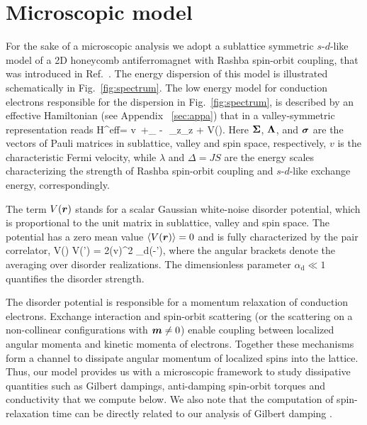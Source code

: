 \section{Microscopic model}

For the sake of a microscopic analysis we adopt a sublattice symmetric $s$-$d$-like model of a 2D honeycomb antiferromagnet with Rashba spin-orbit coupling, that was introduced in Ref.~\cite{Sumit2019}. The energy dispersion of this model is illustrated schematically in Fig.~\ref{fig:spectrum}.  
The low energy model for conduction electrons responsible for the dispersion in Fig.~\ref{fig:spectrum}, is described by an effective Hamiltonian (see Appendix ~\ref{sec:appa}) that in a valley-symmetric representation reads
\be
\label{eff}
H^\textrm{eff}= v\, \cdot\bb{\Sigma}+\lambda\lt[\bb{\sigma}\times\bb{\Sigma}\rt]_{} - \Delta\,\cdot\bb{\sigma}\,\Sigma_z\Lambda_z + V().
\e
Here $\boldsymbol{\Sigma}$, $\boldsymbol{\Lambda}$, and $\boldsymbol{\sigma}$ are the vectors of Pauli matrices in sublattice, valley and spin space, respectively, $v$ is the characteristic Fermi velocity, while $\lambda$ and $\Delta=JS$ are the energy scales characterizing the strength of Rashba spin-orbit coupling and $s$-$d$-like exchange energy, correspondingly. 

The term $V(\boldsymbol{r})$ stands for a scalar Gaussian white-noise disorder potential, which is proportional to the unit matrix in sublattice, valley and spin space. The potential has a zero mean value $\langle V(\boldsymbol{r}) \rangle=0$ and is fully characterized by the pair correlator,
\be
\lt\la V() V(') \rt\ra = 2\pi (\hbar v)^2 \alpha_\textrm{d}\;\delta(-'),
\e
where the angular brackets denote the averaging over disorder realizations. The dimensionless parameter $\alpha_\textrm{d}\ll 1$ quantifies the disorder strength. 

The disorder potential is responsible for a momentum relaxation of conduction electrons. Exchange interaction and spin-orbit scattering (or the scattering on a non-collinear configurations with $\boldsymbol{m}\neq 0$) enable coupling between localized angular momenta and kinetic momenta of electrons. Together these mechanisms form a channel to dissipate angular momentum of localized spins into the lattice. Thus, our model provides us with a microscopic framework to study dissipative quantities such as Gilbert dampings, anti-damping spin-orbit torques and conductivity that we compute below. We also note that the computation of spin-relaxation time can be directly related to our analysis of Gilbert damping \cite{Hankiewicz2007,Manchon2017}. 

